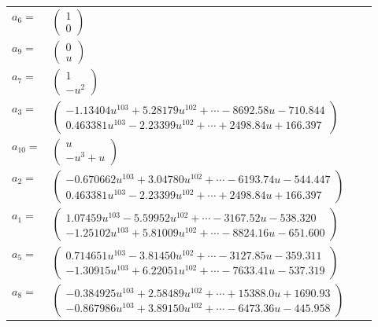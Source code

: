 \documentclass[1p]{elsarticle_modified}
\theoremstyle{definition}
\begin{document}
\begin{tabular}{m{7pt} m{180pt} m{7pt} m{180pt} }
\flushright $a_{6}=$&$\begin{pmatrix}1\\0\end{pmatrix}$ \\
\flushright $a_{9}=$&$\begin{pmatrix}0\\u\end{pmatrix}$ \\
\flushright $a_{7}=$&$\begin{pmatrix}1\\- u^2\end{pmatrix}$ \\
\flushright $a_{3}=$&$\begin{pmatrix}-1.13404 u^{103}+5.28179 u^{102}+\cdots-8692.58 u-710.844\\0.463381 u^{103}-2.23399 u^{102}+\cdots+2498.84 u+166.397\end{pmatrix}$ \\
\flushright $a_{10}=$&$\begin{pmatrix}u\\- u^3+u\end{pmatrix}$ \\
\flushright $a_{2}=$&$\begin{pmatrix}-0.670662 u^{103}+3.04780 u^{102}+\cdots-6193.74 u-544.447\\0.463381 u^{103}-2.23399 u^{102}+\cdots+2498.84 u+166.397\end{pmatrix}$ \\
\flushright $a_{1}=$&$\begin{pmatrix}1.07459 u^{103}-5.59952 u^{102}+\cdots-3167.52 u-538.320\\-1.25102 u^{103}+5.81009 u^{102}+\cdots-8824.16 u-651.600\end{pmatrix}$ \\
\flushright $a_{5}=$&$\begin{pmatrix}0.714651 u^{103}-3.81450 u^{102}+\cdots-3127.85 u-359.311\\-1.30915 u^{103}+6.22051 u^{102}+\cdots-7633.41 u-537.319\end{pmatrix}$ \\
\flushright $a_{8}=$&$\begin{pmatrix}-0.384925 u^{103}+2.58489 u^{102}+\cdots+15388.0 u+1690.93\\-0.867986 u^{103}+3.89150 u^{102}+\cdots-6473.36 u-445.958\end{pmatrix}$ \\

\end{tabular}
\end{document}
